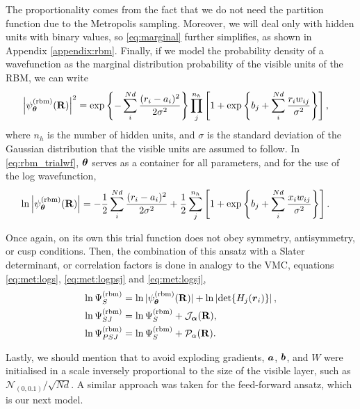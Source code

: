 The proportionality comes from the fact that we do not need the partition function due to the Metropolis sampling. Moreover, we will deal only with hidden units with binary values, so \eqref{eq:marginal} further simplifies, as shown in Appendix \ref{appendix:rbm}. Finally, if we model the probability density of a wavefunction as the marginal distribution probability of the visible units of the RBM, we can write
\begin{align}
   \left| \psi^{(\text{rbm})}_{\boldsymbol{\theta}}(\mathbf{R})\right|^2
                    &=\exp \left\{-\sum_i^{Nd} \frac{(r_i - a_i)^2}{2\sigma^2}\right\}\prod_j^{n_h}\left[ 1 + \exp\left\{b_j + \sum_i^{Nd} \frac{r_i w_{ij}}{\sigma^2}\right\}\right] \label{eq:rbm_trialwf},
\end{align}
where $n_h$ is the number of hidden units, and $\sigma$ is the standard deviation of the Gaussian distribution that the visible units are assumed to follow. In \eqref{eq:rbm_trialwf}, $\boldsymbol{\theta}$ serves as a container for all parameters, and for the use of the log wavefunction,
\begin{align}
   \ln \left| \psi^{(\text{rbm})}_{\boldsymbol{\theta}}(\mathbf{R})\right|
                    &=-\frac{1}{2}\sum_i^{Nd} \frac{(r_i - a_i)^2}{2\sigma^2} + \frac{1}{2}\sum_j^{n_h}\left[ 1 + \exp\left\{b_j + \sum_i^{Nd} \frac{x_i w_{ij}}{\sigma^2}\right\}\right] \label{eq:logrbm_trialwf}.
\end{align}

Once again, on its own this trial function does not obey symmetry, antisymmetry, or cusp conditions. Then, the combination of this ansatz with a Slater determinant, or correlation factors is done in analogy to the VMC, equations \ref{eq:met:logs}, \ref{eq:met:logpsj} and \ref{eq:met:logsj},
\begin{align*}
    \ln \Psi^{(\text{rbm})}_{S} &= \ln|\psi^{(\text{rbm})}_{\boldsymbol{\theta}}(\mathbf{R})| + \ln\left|\det\{H_{j}(\boldsymbol{r}_i)\}\right|, \\ 
    \ln \Psi^{(\text{rbm})}_{SJ} &= \ln \Psi^{(\text{rbm})}_{S} + \mathcal{J}_{\boldsymbol{\alpha}}(\mathbf{R}) ,\\ 
    \ln \Psi^{(\text{rbm})}_{PSJ} &= \ln \Psi^{(\text{rbm})}_{S} + \mathcal{P}_{\alpha}(\mathbf{R}). 
\end{align*}

Lastly, we should mention that to avoid exploding gradients, $\boldsymbol{a}$, $\boldsymbol{b}$, and $W$ were initialised in a scale inversely proportional to the size of the visible layer, such as $\mathcal{N}_{(0, 0.1)}/\sqrt{N d}$. A similar approach was taken for the feed-forward ansatz, which is our next model.

